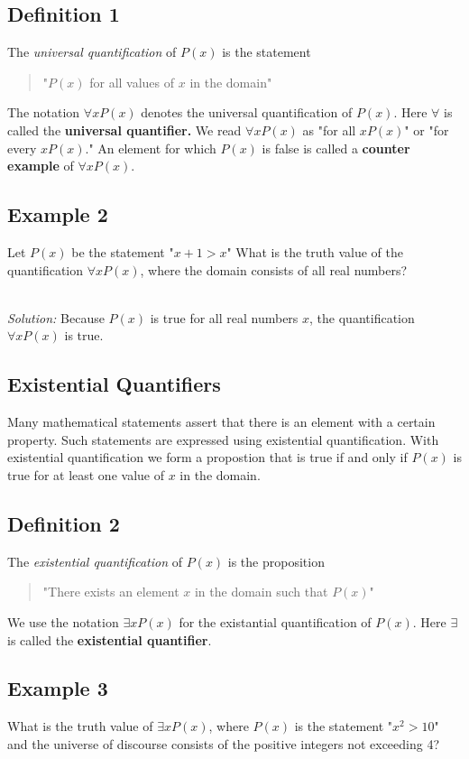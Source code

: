 \documentclass{article}
\begin{document}
\subsection*{Definition 1}
The \textit{universal quantification} of $P(x)$ is the statement
\begin{quote}
	"$P(x)$ for all values of $x$ in the domain"
\end{quote}
The notation $\forall xP(x)$ denotes the universal quantification of $P(x)$. Here $\forall$ is called the \textbf{universal quantifier.}
We read $\forall xP(x)$ as "for all $xP(x)$" or "for every $xP(x)$." An element for which $P(x)$ is false is called a \textbf{counter example} of
$\forall xP(x)$.

\subsection*{Example 2}
Let $P(x)$ be the statement "$x+1>x$" What is the truth value of the quantification $\forall xP(x)$, where the domain consists of all real numbers?

\noindent \\ \textit{Solution:} Because $P(x)$ is true for all real numbers $x$, the quantification $\forall xP(x)$ is true.

\subsection*{Existential Quantifiers}
Many mathematical statements assert that there is an element with a certain property. Such statements are expressed using existential quantification.
With existential quantification we form a propostion that is true if and only if $P(x)$ is true for at least one value of $x$ in the domain.

\subsection*{Definition 2}
The \textit{existential quantification} of $P(x)$ is the proposition
\begin{quote}
	"There exists an element $x$ in the domain such that $P(x)$"
\end{quote}
We use the notation $\exists xP(x)$ for the existantial quantification of $P(x)$. Here $\exists$ is called the \textbf{existential quantifier}.

\subsection*{Example 3}
What is the truth value of $\exists xP(x)$, where $P(x)$ is the statement "$x^2 > 10$" and the universe of discourse consists of the
positive integers not exceeding 4?
\end{document}
